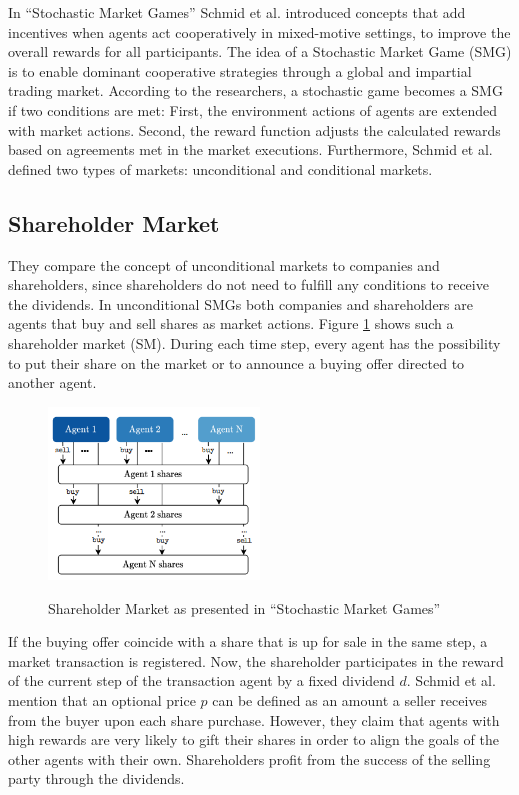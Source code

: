 In ``Stochastic Market Games'' \cite{scbe21} Schmid et al. introduced concepts that add incentives when agents act cooperatively in mixed-motive settings, to improve the overall rewards for all participants. The idea of a Stochastic Market Game (SMG) is to enable dominant cooperative strategies through a global and impartial trading market. According to the researchers, a stochastic game becomes a SMG if two conditions are met: First, the environment actions of agents are extended with market actions. Second, the reward function adjusts the calculated rewards based on agreements met in the market executions. Furthermore, Schmid et al. defined two types of markets: unconditional and conditional markets.

\subsection{Shareholder Market}
They compare the concept of unconditional markets to companies and shareholders, since shareholders do not need to fulfill any conditions to receive the dividends. In unconditional SMGs both companies and shareholders are agents that buy and sell shares as market actions. Figure \ref{fig:sm} shows such a shareholder market (SM). During each time step, every agent has the possibility to put their share on the market or to announce a buying offer directed to another agent.

\begin{figure}[hpbt]
    \centering
    \includegraphics[width=0.5\textwidth]{pictures/SMG_sm}\\
    \caption[Shareholder Market]{Shareholder Market as presented in ``Stochastic Market Games'' \cite{scbe21}}\label{fig:sm}
\end{figure}

If the buying offer coincide with a share that is up for sale in the same step, a market transaction is registered. Now, the shareholder participates in the reward of the current step of the transaction agent by a fixed dividend $d$. Schmid et al. mention that an optional price $p$ can be defined as an amount a seller receives from the buyer upon each share purchase. However, they claim that agents with high rewards are very likely to gift their shares in order to align the goals of the other agents with their own. Shareholders profit from the success of the selling party through the dividends.

